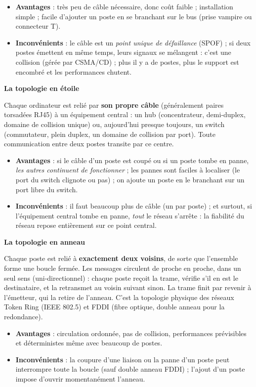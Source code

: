 \documentclass[11pt]{article}
\newcommand{\cle}[1]{{\popxbold\color{popdark}#1}}
\begin{document}
\begin{itemize}
\item \textbf{Avantages} : très peu de câble nécessaire, donc coût faible ; installation simple ; facile d'ajouter un poste en se branchant sur le bus (prise vampire ou connecteur T).
\item \textbf{Inconvénients} : le câble est un \emph{point unique de défaillance} (SPOF) ; si deux postes émettent en même temps, leurs signaux se mélangent : c'est une \cle{collision} (gérée par CSMA/CD) ; plus il y a de postes, plus le support est encombré et les performances chutent.
\end{itemize}

\textbf{La topologie en étoile}\par
Chaque ordinateur est relié par \textbf{son propre câble} (généralement paires torsadées RJ45) à un équipement central : un \cle{hub} (concentrateur, demi-duplex, domaine de collision unique) ou, aujourd'hui presque toujours, un \cle{switch} (commutateur, plein duplex, un domaine de collision par port). Toute communication entre deux postes transite par ce centre.

\begin{itemize}
\item \textbf{Avantages} : si le câble d'un poste est coupé ou si un poste tombe en panne, \emph{les autres continuent de fonctionner} ; les pannes sont faciles à localiser (le port du switch clignote ou pas) ; on ajoute un poste en le branchant sur un port libre du switch.
\item \textbf{Inconvénients} : il faut beaucoup plus de câble (un par poste) ; et surtout, si l'équipement central tombe en panne, \emph{tout} le réseau s'arrête : la fiabilité du réseau repose entièrement sur ce point central.
\end{itemize}

\textbf{La topologie en anneau}\par
Chaque poste est relié à \textbf{exactement deux voisins}, de sorte que l'ensemble forme une boucle fermée. Les messages circulent de proche en proche, dans un seul sens (uni-directionnel) : chaque poste reçoit la trame, vérifie s'il en est le destinataire, et la retransmet au voisin suivant sinon. La trame finit par revenir à l'émetteur, qui la retire de l'anneau. C'est la topologie physique des réseaux Token Ring (IEEE 802.5) et FDDI (fibre optique, double anneau pour la redondance).

\begin{itemize}
\item \textbf{Avantages} : circulation ordonnée, pas de collision, performances prévisibles et déterministes même avec beaucoup de postes.
\item \textbf{Inconvénients} : la coupure d'une liaison ou la panne d'un poste peut interrompre toute la boucle (sauf double anneau FDDI) ; l'ajout d'un poste impose d'ouvrir momentanément l'anneau.
\end{itemize}
\end{document}
